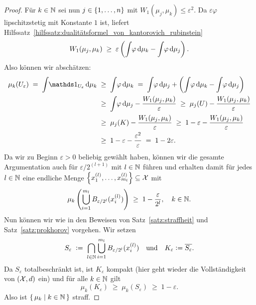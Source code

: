 \documentclass[../thesis/thesis.tex]{subfiles}
\begin{document}
\begin{proof}
		Für  $k \in \mathbb{N}$ sei nun $j \in \left\{1, \dots, n\right\}$ mit $W_1(\mu_j, \mu_k) \leq \varepsilon^2$. Da $\varepsilon\varphi$ lipschitzstetig mit Konstante $1$ ist, liefert Hilfssatz~\ref{hilfssatz:dualitätsformel_von_kantorovich_rubinstein}
		\[ W_1(\mu_j, \mu_k) \; \geq \; \varepsilon \left( \int_{} \, \varphi \, \mathrm{d}\mu_k - \int_{} \, \varphi \, \mathrm{d}\mu_j \right) \text{.} \]
		Also können wir abschätzen:
		\begin{align*}
			\mu_k(U_\varepsilon) \; = \; \measureint{}{\indfct_{U_\varepsilon}}{\mu_k} \; &\geq \; \measureint{}{\varphi}{\mu_k} \; = \; \measureint{}{\varphi}{\mu_j} + \left( \measureint{}{\varphi}{\mu_k} - \measureint{}{\varphi}{\mu_j} \right) \\
			                                                                              &\geq \; \measureint{}{\varphi}{\mu_j} - \frac{W_1(\mu_j, \mu_k)}{\varepsilon} \; \geq \; \mu_j(U) - \frac{W_1(\mu_j, \mu_k)}{\varepsilon} \\
			                                                                              &\geq \; \mu_j(K) - \frac{W_1(\mu_j, \mu_k)}{\varepsilon} \; \geq \; 1 - \varepsilon - \frac{W_1(\mu_j, \mu_k)}{\varepsilon} \\
			                                                                              &\geq \; 1 - \varepsilon - \frac{\varepsilon^2}{\varepsilon} \; = \; 1 - 2\varepsilon \text{.}
		\end{align*}
		Da wir zu Beginn $\varepsilon > 0$ beliebig gewählt haben, können wir die gesamte Argumentation auch für $\varepsilon/2^{(l+1)}$ mit $l \in \mathbb{N}$ führen und erhalten damit für jedes $l \in \mathbb{N}$ 
		eine endliche Menge $\left\{x_1^{(l)}, \dots, x_{m_l}^{(l)}\right\} \subseteq \mathcal{X}$ mit
		\[ \mu_k \left( \bigcup_{i=1}^{m_l} B_{\varepsilon/2^l}(x_i^{(l)}) \right) \; \geq \; 1 - \frac{\varepsilon}{2^l}, \quad k \in \mathbb{N} \text{.} \]
		Nun können wir wie in den Beweisen von Satz~\ref{satz:straffheit} und Satz~\ref{satz:prokhorov} vorgehen.
		Wir setzen
		\[ S_{\varepsilon} \; \vcentcolon = \; \bigcap_{l \in \mathbb{N}} \bigcup_{i=1}^{m_l} B_{\varepsilon/2^l}(x_i^{(l)}) \quad \text{und} \quad K_{\varepsilon} \vcentcolon = \overline{S_\varepsilon} \text{.} \]
		Da $S_{\varepsilon}$ totalbeschränkt ist, ist $K_{\varepsilon}$ kompakt (hier geht wieder die Vollständigkeit von $(\mathcal{X}, d)$ ein) und für alle $k \in \mathbb{N}$ gilt
		\[ \mu_k(K_{\varepsilon}) \; \geq \; \mu_k(S_{\varepsilon}) \; \geq \; 1 - \varepsilon \text{.} \]
		Also ist $\left\{\, \mu_k \; \middle| \; k \in \mathbb{N} \,\right\}$ straff.
	\end{proof}
\end{document}
